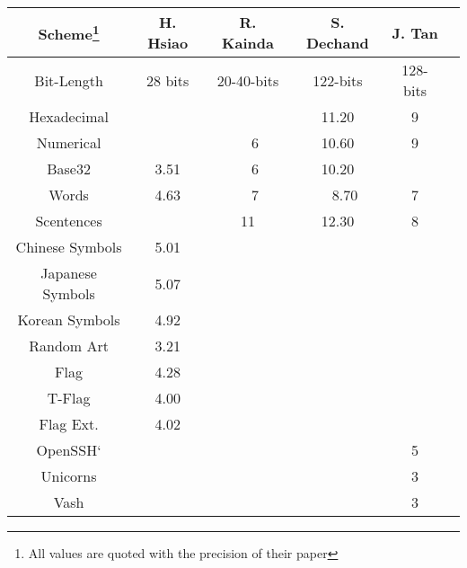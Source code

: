 \begin{tabular}{c|ccccc}
    \toprule
    \textbf{Scheme\footnote{All values are quoted with the precision  of their paper}} 
    & \textbf{H. Hsiao}\cite{hsiao2009study}      
    & \textbf{R. Kainda}\cite{kainda2009usability}      
    & \textbf{S. Dechand}\cite{dechand2016empirical}
    & \textbf{J. Tan}\cite{tan2017can}      
    \\\hline
    Bit-Length      & 28 bits   & 20-40-bits & 122-bits & 128-bits
    \\\hline
    Hexadecimal     &           &        & 11.20   & 9\\
    Numerical       &           & ~~6    & 10.60   & 9\\
    Base32          & 3.51      & ~~6    & 10.20   & \\
    Words           & 4.63      & ~~7    & ~~8.70    & 7 \\
    Scentences      &           & 11     & 12.30   & 8 \\
    Chinese Symbols & 5.01      &           &         & \\
    Japanese Symbols& 5.07      &           &         & \\
    Korean Symbols  & 4.92   &           &         & \\
    \midrule
    Random Art	     & 3.21   &&&&\\
    Flag    	     & 4.28   &&&&\\
    T-Flag  	     & 4.00   &&&&\\
    Flag Ext.	     & 4.02   &&&&\\
    OpenSSH`         &&&& 5 &\\
    Unicorns         &&&& 3 &\\
    Vash             &&&& 3 &\\
    \bottomrule
\end{tabular}
